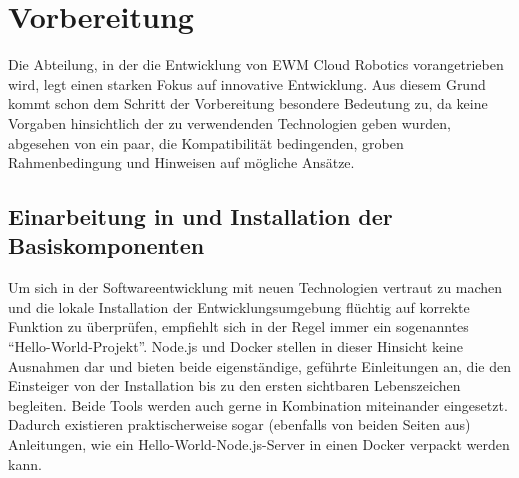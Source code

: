 \chapter{Vorbereitung}
Die Abteilung, in der die Entwicklung von \ac{EWM} Cloud Robotics vorangetrieben wird, legt einen starken Fokus auf innovative Entwicklung.
Aus diesem Grund kommt schon dem Schritt der Vorbereitung besondere Bedeutung zu, da keine Vorgaben hinsichtlich der zu verwendenden Technologien geben wurden, abgesehen von ein paar, die Kompatibilität bedingenden, groben Rahmenbedingung und Hinweisen auf mögliche Ansätze.


\section{Einarbeitung in und Installation der Basiskomponenten}
\label{sec:einarbeitung}
Um sich in der Softwareentwicklung mit neuen Technologien vertraut zu machen und die lokale Installation der Entwicklungsumgebung flüchtig auf korrekte Funktion zu überprüfen, empfiehlt sich in der Regel immer ein sogenanntes \enquote{Hello-World-Projekt}.
Node.js und Docker stellen in dieser Hinsicht keine Ausnahmen dar und bieten beide eigenständige, geführte Einleitungen an, die den Einsteiger von der Installation bis zu den ersten sichtbaren Lebenszeichen begleiten.
Beide Tools werden auch gerne in Kombination miteinander eingesetzt.
Dadurch existieren praktischerweise sogar (ebenfalls von beiden Seiten aus) Anleitungen, wie ein Hello-World-Node.js-Server in einen Docker verpackt werden kann.~\cite{docker-node-hello}

